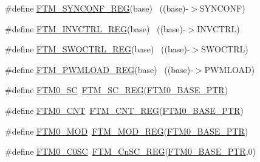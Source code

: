 \begin{DoxyCompactItemize}
\item 
\#define \hyperlink{group___f_t_m___register___accessor___macros_gab945eb614e7150c2e0048fb7b684ebad}{F\+T\+M\+\_\+\+S\+Y\+N\+C\+O\+N\+F\+\_\+\+R\+EG}(base)                                    ~((base)-\/$>$S\+Y\+N\+C\+O\+NF)
\item 
\#define \hyperlink{group___f_t_m___register___accessor___macros_gaa802450fbaa2dc424ffe4838d5c9a89b}{F\+T\+M\+\_\+\+I\+N\+V\+C\+T\+R\+L\+\_\+\+R\+EG}(base)                                    ~((base)-\/$>$I\+N\+V\+C\+T\+RL)
\item 
\#define \hyperlink{group___f_t_m___register___accessor___macros_ga9d8f5821b8f521665946f61a878a3963}{F\+T\+M\+\_\+\+S\+W\+O\+C\+T\+R\+L\+\_\+\+R\+EG}(base)                                    ~((base)-\/$>$S\+W\+O\+C\+T\+RL)
\item 
\#define \hyperlink{group___f_t_m___register___accessor___macros_ga2788d558fe351bdcafa92b44f8611c03}{F\+T\+M\+\_\+\+P\+W\+M\+L\+O\+A\+D\+\_\+\+R\+EG}(base)                                    ~((base)-\/$>$P\+W\+M\+L\+O\+AD)
\item 
\#define \hyperlink{group___f_t_m___register___accessor___macros_gaa8cb4b7bcccc202d9256a35e2557c359}{F\+T\+M0\+\_\+\+SC}~\hyperlink{group___f_t_m___register___accessor___macros_ga0b48df6cbccecf754cc49bb7ea1e3aad}{F\+T\+M\+\_\+\+S\+C\+\_\+\+R\+EG}(\hyperlink{group___f_t_m___peripheral_gae712c29b7abcf338d8f8f6418683fa66}{F\+T\+M0\+\_\+\+B\+A\+S\+E\+\_\+\+P\+TR})
\item 
\#define \hyperlink{group___f_t_m___register___accessor___macros_ga8049141666e13721ffe63b8211198740}{F\+T\+M0\+\_\+\+C\+NT}~\hyperlink{group___f_t_m___register___accessor___macros_ga1ba1654f76ecc24de48047117cb5b45e}{F\+T\+M\+\_\+\+C\+N\+T\+\_\+\+R\+EG}(\hyperlink{group___f_t_m___peripheral_gae712c29b7abcf338d8f8f6418683fa66}{F\+T\+M0\+\_\+\+B\+A\+S\+E\+\_\+\+P\+TR})
\item 
\#define \hyperlink{group___f_t_m___register___accessor___macros_ga56f8edd0307e766bdde08dbd8cb616c7}{F\+T\+M0\+\_\+\+M\+OD}~\hyperlink{group___f_t_m___register___accessor___macros_gabbea5752afc54317fcb50890f8593a49}{F\+T\+M\+\_\+\+M\+O\+D\+\_\+\+R\+EG}(\hyperlink{group___f_t_m___peripheral_gae712c29b7abcf338d8f8f6418683fa66}{F\+T\+M0\+\_\+\+B\+A\+S\+E\+\_\+\+P\+TR})
\item 
\#define \hyperlink{group___f_t_m___register___accessor___macros_gaefd4cbc438ea3f1cb88052b669071fb1}{F\+T\+M0\+\_\+\+C0\+SC}~\hyperlink{group___f_t_m___register___accessor___macros_ga49332bccc11dd36d399f3fff66f313b5}{F\+T\+M\+\_\+\+Cn\+S\+C\+\_\+\+R\+EG}(\hyperlink{group___f_t_m___peripheral_gae712c29b7abcf338d8f8f6418683fa66}{F\+T\+M0\+\_\+\+B\+A\+S\+E\+\_\+\+P\+TR},0)

\end{DoxyCompactItemize}
